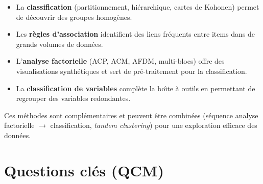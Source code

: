 \documentclass[a4paper,11pt]{article}
\theoremstyle{definition}
\theoremstyle{remark}
\begin{document}
\begin{itemize}
  \item La \textbf{classification} (partitionnement, hi\'erarchique,
    cartes de Kohonen) permet de d\'ecouvrir des groupes homog\`enes.
  \item Les \textbf{r\`egles d'association} identifient des liens
    fr\'equents entre items dans de grands volumes de donn\'ees.
  \item L'\textbf{analyse factorielle} (ACP, ACM, AFDM, multi-blocs)
    offre des visualisations synth\'etiques et sert de
    pr\'e-traitement pour la classification.
  \item La \textbf{classification de variables} compl\`ete la bo\^\i te
    \`a outils en permettant de regrouper des variables redondantes.
\end{itemize}

Ces m\'ethodes sont compl\'ementaires et peuvent \^etre combin\'ees
(s\'equence analyse factorielle $\rightarrow$ classification,
\emph{tandem clustering}) pour une exploration efficace des donn\'ees.

\section*{Questions cl\'es (QCM)}

\end{document}
